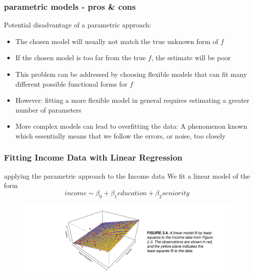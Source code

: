 \documentclass{beamer}
\begin{document}
\begin{frame}
\frametitle{parametric models - pros \& cons}
Potential disadvantage of a parametric approach:
\begin{itemize}
\item The chosen model will usually not match the true unknown form of $f$
\item If the chosen model is too far from the true $f$, the estimate will be poor
\item This problem can be addressed by choosing flexible models that can fit many different possible functional forms for $f$
\item However: fitting a more flexible model in general requires estimating a
greater number of parameters
\newline
\item More complex models can lead to overfitting the data: 
A phenomenon known which essentially means that we follow the errors,
or noise, too closely
\end{itemize}
\end{frame}

\begin{frame}
\frametitle{Fitting Income Data with Linear
Regression}
 applying the parametric approach to the Income data
We fit a linear model of the form
\begin{equation*}
income \sim \beta_0 + \beta_1 education+ \beta_2 seniority
\end{equation*}
\begin{figure}
\includegraphics[width = 1.1\linewidth]{figures/03/figure_2_4.png}
\end{figure}

\end{frame}
\end{document}
